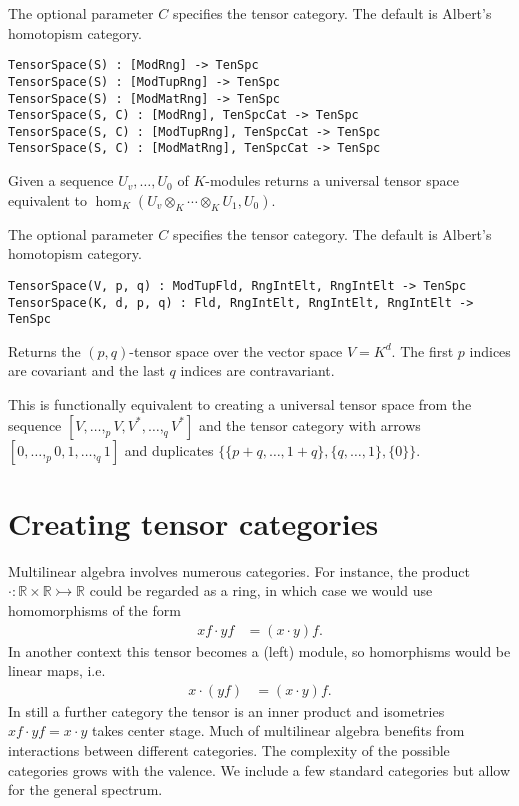\documentclass{amsart}
\begin{document}
The optional parameter $C$ specifies the tensor category.  The default is
Albert's homotopism category. 

\color{blue}
{\small \begin{verbatim}
TensorSpace(S) : [ModRng] -> TenSpc
TensorSpace(S) : [ModTupRng] -> TenSpc
TensorSpace(S) : [ModMatRng] -> TenSpc
TensorSpace(S, C) : [ModRng], TenSpcCat -> TenSpc
TensorSpace(S, C) : [ModTupRng], TenSpcCat -> TenSpc
TensorSpace(S, C) : [ModMatRng], TenSpcCat -> TenSpc
\end{verbatim} }
\color{black}

Given a sequence $U_v,\dots, U_0$ of $K$-modules returns a universal tensor 
space equivalent to $\hom_K(U_v\otimes_K\cdots\otimes_K U_1,U_0)$.  


The optional parameter $C$ specifies the tensor category.  The default is
Albert's homotopism category. 

\color{blue}
{\small \begin{verbatim}
TensorSpace(V, p, q) : ModTupFld, RngIntElt, RngIntElt -> TenSpc
TensorSpace(K, d, p, q) : Fld, RngIntElt, RngIntElt, RngIntElt -> TenSpc
\end{verbatim} }
\color{black}

Returns the $(p,q)$-tensor space over the vector space $V=K^d$. The first $p$
indices are covariant and the last $q$ indices are contravariant.  

This is functionally equivalent
to creating a universal tensor space from the sequence 
$[V,\dots,_p V, V^*,\dots,_q V^*]$
and the tensor category with arrows $[0,\dots,_p 0, 1,\dots,_q 1]$ and 
duplicates $\{\{p+q,\dots,1+q\},\{q,\dots,1\},\{0\}\}$.

\section{Creating tensor categories}

Multilinear algebra involves numerous categories.  For instance, the product 
$\cdot:\mathbb{R}\times \mathbb{R}\rightarrowtail\mathbb{R}$ could be regarded 
as a ring, in which case we would use homomorphisms of the form
\begin{align*}
	xf\cdot yf & = (x\cdot y)f.
\end{align*}
In another context this tensor becomes a (left) module, so homorphisms would be 
linear maps, i.e.
\begin{align*}
	x\cdot (yf) & = (x\cdot y)f.
\end{align*}
In still a further category the tensor is an inner product and isometries 
$xf\cdot yf = x\cdot y$ takes center stage. Much of multilinear algebra benefits
from interactions between different categories. The complexity of the possible 
categories grows with the valence.  We include a few standard categories but 
allow for the general spectrum.
\end{document}
